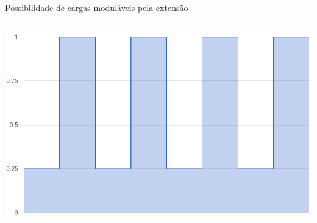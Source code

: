 \begin{frame}{Possibilidade de cargas moduláveis pela extensão}
\begin{columns}
\begin{minipage}[c][0.4\textheight][c]{\linewidth}
			\centering
			\includegraphics[width=0.8\linewidth]{../monograph/images/carga-sintetica3.png}
			\label{fig:onda-gradrada}
		\end{minipage}
	\end{columns}
\end{frame}

